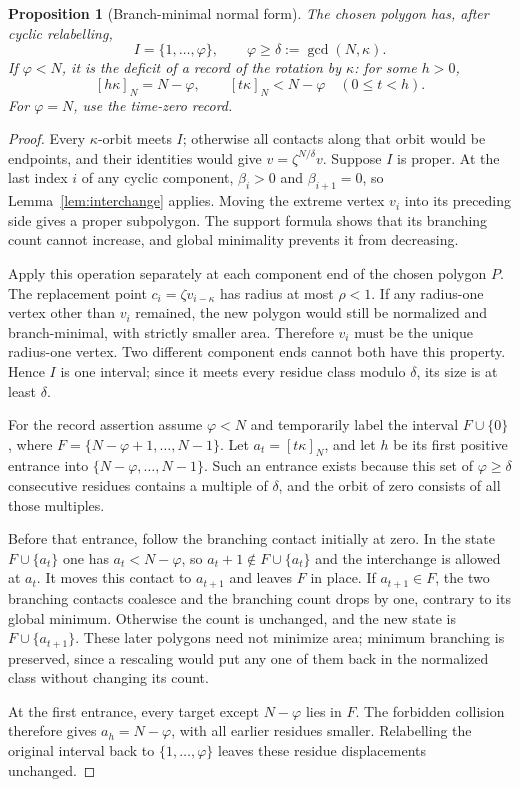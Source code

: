 \documentclass[11pt,a4paper]{article}
\newtheorem{proposition}[theorem]{Proposition}
\theoremstyle{definition}
\theoremstyle{remark}
\numberwithin{equation}{section}
\begin{document}
\begin{proposition}[Branch-minimal normal form]\label{prop:interval}
The chosen polygon has, after cyclic relabelling,
\[
 I=\{1,\ldots,\varphi\},\qquad \varphi\ge\delta:=\gcd(N,\kappa).
\]
If $\varphi<N$, it is the deficit of a record of the rotation by $\kappa$: for some $h>0$,
\begin{equation}\label{eq:record}
 [h\kappa]_N=N-\varphi,
 \qquad [t\kappa]_N<N-\varphi\quad(0\le t<h).
\end{equation}
For $\varphi=N$, use the time-zero record.
\end{proposition}
\begin{proof}
Every $\kappa$-orbit meets $I$; otherwise all contacts along that orbit would be endpoints, and their identities would give $v=\zeta^{N/\delta}v$. Suppose $I$ is proper. At the last index $i$ of any cyclic component, $\beta_i>0$ and $\beta_{i+1}=0$, so Lemma~\ref{lem:interchange} applies. Moving the extreme vertex $v_i$ into its preceding side gives a proper subpolygon. The support formula shows that its branching count cannot increase, and global minimality prevents it from decreasing.

Apply this operation separately at each component end of the chosen polygon $P$. The replacement point $c_i=\zeta v_{i-\kappa}$ has radius at most $\rho<1$. If any radius-one vertex other than $v_i$ remained, the new polygon would still be normalized and branch-minimal, with strictly smaller area. Therefore $v_i$ must be the unique radius-one vertex. Two different component ends cannot both have this property. Hence $I$ is one interval; since it meets every residue class modulo $\delta$, its size is at least $\delta$.

For the record assertion assume $\varphi<N$ and temporarily label the interval $F\cup\{0\}$, where $F=\{N-\varphi+1,\ldots,N-1\}$. Let $a_t=[t\kappa]_N$, and let $h$ be its first positive entrance into $\{N-\varphi,\ldots,N-1\}$. Such an entrance exists because this set of $\varphi\ge\delta$ consecutive residues contains a multiple of $\delta$, and the orbit of zero consists of all those multiples.

Before that entrance, follow the branching contact initially at zero. In the state $F\cup\{a_t\}$ one has $a_t<N-\varphi$, so $a_t+1\notin F\cup\{a_t\}$ and the interchange is allowed at $a_t$. It moves this contact to $a_{t+1}$ and leaves $F$ in place. If $a_{t+1}\in F$, the two branching contacts coalesce and the branching count drops by one, contrary to its global minimum. Otherwise the count is unchanged, and the new state is $F\cup\{a_{t+1}\}$. These later polygons need not minimize area; minimum branching is preserved, since a rescaling would put any one of them back in the normalized class without changing its count.

At the first entrance, every target except $N-\varphi$ lies in $F$. The forbidden collision therefore gives $a_h=N-\varphi$, with all earlier residues smaller. Relabelling the original interval back to $\{1,\ldots,\varphi\}$ leaves these residue displacements unchanged.
\end{proof}
\end{document}
